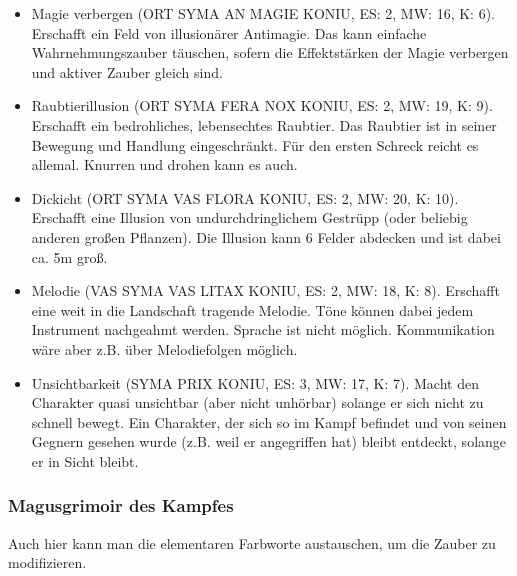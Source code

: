 \documentclass{article}
\begin{document}
\begin{itemize}
\item Magie verbergen (ORT SYMA AN MAGIE KONIU, ES: 2, MW: 16, K: 6). Erschafft ein Feld von illusionärer Antimagie. Das kann einfache Wahrnehmungszauber täuschen, sofern die Effektstärken der Magie verbergen und aktiver Zauber gleich sind.
\item Raubtierillusion (ORT SYMA FERA NOX KONIU, ES: 2, MW: 19, K: 9). Erschafft ein bedrohliches, lebensechtes Raubtier. Das Raubtier ist in seiner Bewegung und Handlung eingeschränkt. Für den ersten Schreck reicht es allemal. Knurren und drohen kann es auch.
\item Dickicht (ORT SYMA VAS FLORA KONIU, ES: 2, MW: 20, K: 10). Erschafft eine Illusion von undurchdringlichem Gestrüpp (oder beliebig anderen großen Pflanzen). Die Illusion kann 6 Felder abdecken und ist dabei ca. 5m groß.
\item Melodie (VAS SYMA VAS LITAX KONIU, ES: 2, MW: 18, K: 8). Erschafft eine weit in die Landschaft tragende Melodie. Töne können dabei jedem Instrument nachgeahmt werden. Sprache ist nicht möglich. Kommunikation wäre aber z.B. über Melodiefolgen möglich.
\item Unsichtbarkeit (SYMA PRIX KONIU, ES: 3, MW: 17, K: 7). Macht den Charakter quasi unsichtbar (aber nicht unhörbar) solange er sich nicht zu schnell bewegt. Ein Charakter, der sich so im Kampf befindet und von seinen Gegnern gesehen wurde (z.B. weil er angegriffen hat) bleibt entdeckt, solange er in Sicht bleibt.
\end{itemize}

\subsubsection{Magusgrimoir des Kampfes}

Auch hier kann man die elementaren Farbworte austauschen, um die Zauber zu modifizieren.
\end{document}
